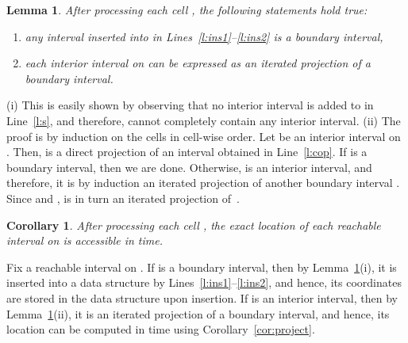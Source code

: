 \documentclass[12pt]{dalthesis}
\def\favoritefont{\bfseries \sffamily}
\def\QED{\ensuremath{{\Box}}}
\def\markatright#1{\leavevmode\unskip\nobreak\quad\hspace*{\fill}{#1}}
\newenvironment{proof}
	{\begin{trivlist}\item[\hskip\labelsep{\favoritefont Proof:}]}
	{\markatright{\QED}\end{trivlist}}
\newtheorem{lemma}[theorem]{Lemma}
\newtheorem{corollary}[theorem]{Corollary}
\begin{document}
\begin{lemma} \label{lemma:prop}
	After processing each cell , 
	the following statements hold true:
	\begin{enumerate}
		\item[\em (i)] any interval inserted into  in Lines~\ref{l:ins1}--\ref{l:ins2} is a boundary interval,
		\item[\em (ii)] each interior interval on 	can be expressed as an iterated projection of a boundary interval.
\end{enumerate}
\end{lemma}
\begin{proof}
	(i) This is easily shown by observing that no interior interval is added to  in Line~\ref{l:s},
	and therefore,  cannot completely contain any interior interval.
	(ii) The proof is by induction on the cells in cell-wise order.
	Let  be an interior interval on . 
	Then,  is a direct projection of an interval  obtained in  Line~\ref{l:cop}.
	If  is a boundary interval, then we are done.
	Otherwise,  is an interior interval, and therefore, 
	it is by induction an iterated projection of another boundary interval .
	Since  and ,
	 is in turn an iterated projection of~.
\end{proof}

\begin{corollary} \label{cor:const}
	After processing each cell , 
	the exact location of each reachable interval on  is accessible in  time.
\end{corollary}

\begin{proof}
	Fix a reachable interval  on .
	If  is a boundary interval, then by Lemma~\ref{lemma:prop}(i), 
	it is inserted into a data structure by Lines~\ref{l:ins1}--\ref{l:ins2},
	and hence, its coordinates are stored in the data structure upon insertion.
	If  is an interior interval, then by Lemma~\ref{lemma:prop}(ii),
	it is an iterated projection of a boundary interval, and hence, its location
	can be computed in  time using Corollary~\ref{cor:project}.
\end{proof}
\end{document}
